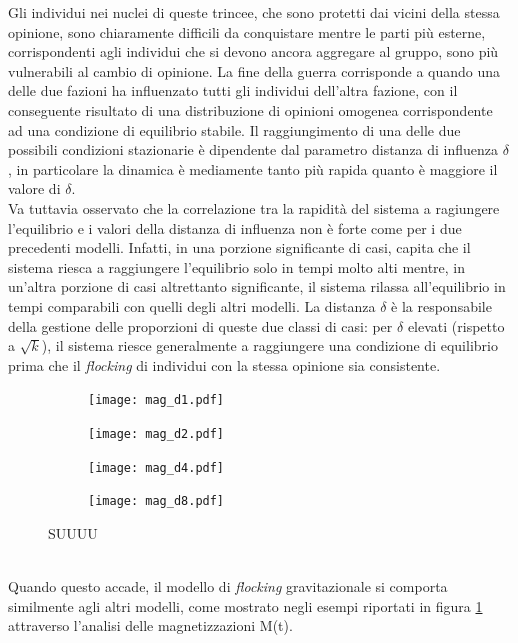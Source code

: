 \documentclass[letterpaper,10pt]{article}
\begin{document}
Gli individui nei nuclei di queste trincee, che sono protetti dai vicini della stessa opinione, sono chiaramente difficili da conquistare mentre le parti più esterne, corrispondenti agli individui che si devono ancora aggregare al gruppo, sono più vulnerabili al cambio di opinione. La fine della guerra corrisponde a quando una delle due fazioni ha influenzato tutti gli individui dell'altra fazione, con il conseguente risultato di una distribuzione di opinioni omogenea corrispondente ad una condizione di equilibrio stabile. Il raggiungimento di una delle due possibili condizioni stazionarie è dipendente dal parametro distanza di influenza $\delta$,  in particolare la dinamica è mediamente tanto più rapida quanto è maggiore il valore di $\delta$.\medskip
\\Va tuttavia osservato che la correlazione tra la rapidità del sistema a ragiungere l'equilibrio e i valori della distanza di influenza non è forte come per i due precedenti modelli. Infatti, in una porzione significante di casi, capita che il sistema riesca a raggiungere l'equilibrio solo in tempi molto alti mentre, in un'altra porzione di casi altrettanto significante, il sistema rilassa all'equilibrio in tempi comparabili con quelli degli altri modelli. La distanza $\delta$ è la responsabile della gestione delle proporzioni di queste due classi di casi: per $\delta$ elevati (rispetto a \textit{$\sqrt k$}), il sistema riesce generalmente a raggiungere una condizione di equilibrio prima che il \textit{flocking} di individui con la stessa opinione sia consistente.
\begin{figure}[h]
\centering
\begin{subfigure}{0.95\textwidth}
\centering
\texttt{[image: mag\_d1.pdf]}
\end{subfigure}
\begin{subfigure}{0.95\textwidth}
\centering
\texttt{[image: mag\_d2.pdf]}
\end{subfigure}
\end{figure}
\begin{figure}[t]
\ContinuedFloat
\centering
\begin{subfigure}{0.95\textwidth}
\centering
\texttt{[image: mag\_d4.pdf]}
\end{subfigure}
\begin{subfigure}{0.95\textwidth}
\centering
\texttt{[image: mag\_d8.pdf]}
\end{subfigure}
\label{Fig:10}
\caption{SUUUU }
\end{figure}
\\
Quando questo accade, il modello di \textit{flocking} gravitazionale si comporta similmente agli altri modelli, come mostrato negli esempi riportati in figura \ref{Fig:10} attraverso l'analisi delle magnetizzazioni M(t). \\
\end{document}
